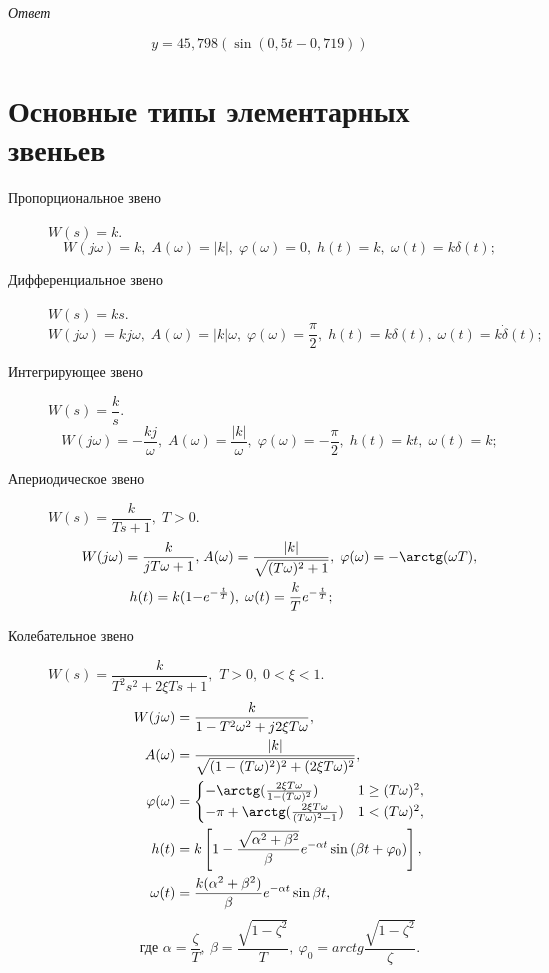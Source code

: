 \documentclass[../../TAU.tex]{subfiles}
\begin{document}
    \textit{Ответ}

    \[
        y=45{,}798(\sin(0{,}5t-0{,}719))
    \]

\section{Основные типы элементарных звеньев} 

\begin{description}
    \item[Пропорциональное звено]
        ${W(s)=k}$.
        $$
            W(j\omega) = k,\; A(\omega) = |k|,\; \varphi(\omega) = 0,\; h(t) = k,\; \omega(t) = k\delta(t);
        $$

    \item[Дифференциальное звено]
        ${W(s) = ks}$.
        $$
            W(j\omega) = kj\omega,\; A(\omega) = |k|\omega, \; \varphi(\omega) = \frac{\pi}{2},\; h(t) = k\delta(t),\; \omega(t) = k\dot\delta(t);
        $$

    \item[Интегрирующее звено]
        ${W(s) = \dfrac{k}{s}}$.
        $$
            W(j\omega) = -\frac{k j}{\omega},\; A(\omega) = \frac{|k|}{\omega},\; \varphi(\omega) = -\frac{\pi}{2},\; h(t) = kt,\; \omega(t) = k;
        $$

    \item[Апериодическое звено] 
        ${W(s) = \dfrac{k}{Ts+1},\; T>0}$.
        $$
            \begin{aligned}
                W(j\omega) = \frac{k}{jT\omega+1},\; &A(\omega) = \frac{|k|}{\sqrt{(T\omega)^2+1}},\; \varphi(\omega) = -\arctg(\omega T),\\ h(t) = k(1-&e^{-\frac{t}{T}}),\; \omega(t) = \frac{k}{T}e^{-\frac{t}{T}};
            \end{aligned}
        $$

    \item[Колебательное звено]
        ${W(s) = \dfrac{k}{T^2s^2+2\xi Ts+1},}$ ${T>0,\; 0 < \xi < 1.}$
        $$
            \begin{aligned}
                W(j\omega) &= \frac{k}{1-T^2\omega^2 +j2\xi T\omega},\\
                A(\omega) &= \frac{|k|}{\sqrt{(1-(T\omega)^2)^2 + (2\xi T\omega)^2}},\\
                \varphi(\omega) &=
                \begin{cases}
                    -\arctg(\frac{2\xi T\omega}{1-(T\omega)^2}) & 1 \ge (T\omega)^2,\\
                    -\pi+\arctg(\frac{2\xi T\omega}{(T\omega)^2-1}) & 1 < (T\omega)^2,
                \end{cases}\\
                h(t) &= k\left[1-\frac{\sqrt{\alpha^2+\beta^2}}{\beta} e^{-\alpha t} \sin{(\beta t+\varphi_0)}\right],\\
                \omega(t) &= \frac{k (\alpha^2 + \beta^2)}{\beta} e^{-\alpha t} \sin{\beta  t},
            \end{aligned}
        $$
        $$
            \text{где } \alpha = \frac{\zeta}{T},\ \beta=\frac{\sqrt{1-\zeta^2}}{T},\ \varphi_0=arctg{\frac{\sqrt{1-\zeta^2}}{\zeta}}.
        $$


\end{description}
\end{document}
